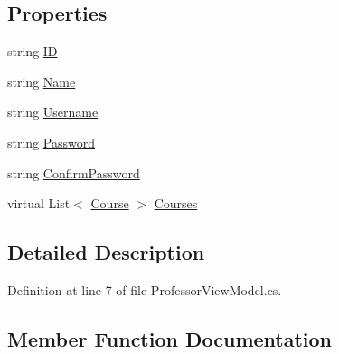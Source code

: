 \subsection*{Properties}
\begin{DoxyCompactItemize}
\item 
string \hyperlink{class_uni_enrollment___m_v_c_1_1_models_1_1_professor_view_model_ac1aabbd7b2f7b9b531ede5064097b73d}{ID}
\item 
string \hyperlink{class_uni_enrollment___m_v_c_1_1_models_1_1_professor_view_model_a892125a1dc3a4e4d8c908a7b2aff87fa}{Name}
\item 
string \hyperlink{class_uni_enrollment___m_v_c_1_1_models_1_1_professor_view_model_a4a8450ec4af630eb473c2f88036cb26a}{Username}
\item 
string \hyperlink{class_uni_enrollment___m_v_c_1_1_models_1_1_professor_view_model_a925e191c8c2babf6240a7c99fb2c08b5}{Password}
\item 
string \hyperlink{class_uni_enrollment___m_v_c_1_1_models_1_1_professor_view_model_ae87fa85f8261a37cb829b4224cccf67b}{Confirm\+Password}
\item 
virtual List$<$ \hyperlink{class_uni_enrollment___m_v_c_1_1_models_1_1_course}{Course} $>$ \hyperlink{class_uni_enrollment___m_v_c_1_1_models_1_1_professor_view_model_a5a3f032e8a875112049116f75d9a8b73}{Courses}
\end{DoxyCompactItemize}


\subsection{Detailed Description}


Definition at line 7 of file Professor\+View\+Model.\+cs.



\subsection{Member Function Documentation}
